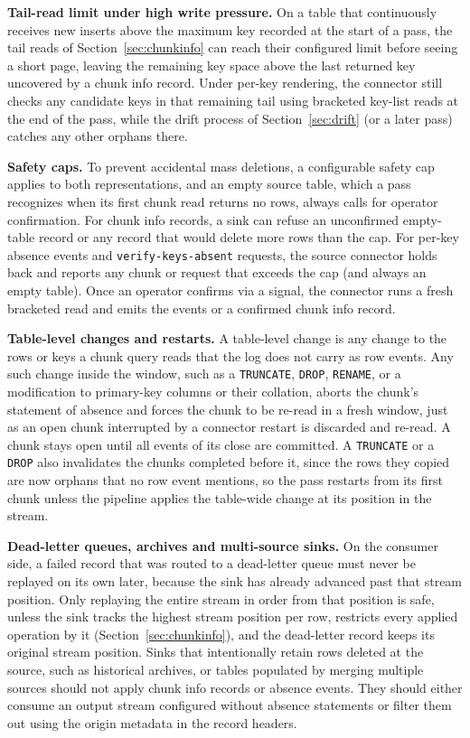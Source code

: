 \documentclass[sigconf,nonacm,10pt]{acmart}
\begin{document}
\textbf{Tail-read limit under high write pressure.} On a table that
continuously receives new inserts above the maximum key recorded at the start
of a pass, the tail reads of Section~\ref{sec:chunkinfo} can reach their
configured limit before seeing a short page, leaving the remaining key space
above the last returned key uncovered by a chunk info record. Under per-key
rendering, the connector still checks any candidate keys in that remaining tail
using bracketed key-list reads at the end of the pass, while the drift process
of Section~\ref{sec:drift} (or a later pass) catches any other orphans there.

\textbf{Safety caps.} To prevent accidental mass deletions, a configurable
safety cap applies to both representations, and an empty source table, which a pass recognizes when its first chunk read
returns no rows, always calls for operator confirmation. For chunk info records, a sink can refuse an
unconfirmed empty-table record or any record that would delete more rows than
the cap. For per-key absence events and \texttt{verify-keys-absent} requests,
the source connector holds back and reports any chunk or request that exceeds
the cap (and always an empty table). Once an operator confirms via a signal,
the connector runs a fresh bracketed read and emits the events or a confirmed
chunk info record.

\textbf{Table-level changes and restarts.} A table-level change is any change
to the rows or keys a chunk query reads that the log does not carry as row
events. Any such change inside the window, such as a \texttt{TRUNCATE},
\texttt{DROP}, \texttt{RENAME}, or a modification to primary-key columns or
their collation, aborts the chunk's statement of absence and forces the chunk to be re-read in a
fresh window, just as an open chunk interrupted by a connector restart is
discarded and re-read. A chunk stays open until all events of its close
are committed. A \texttt{TRUNCATE} or a \texttt{DROP} also invalidates
the chunks completed before it, since the rows they copied are now orphans that
no row event mentions, so the pass restarts from its first chunk unless the
pipeline applies the table-wide change at its position in the stream.

\textbf{Dead-letter queues, archives and multi-source sinks.} On the consumer
side, a failed record that was routed to a dead-letter queue must never be
replayed on its own later, because the sink has already advanced past that
stream position. Only replaying the entire stream in order from that position is
safe, unless the sink tracks the highest stream position per row, restricts
every applied operation by it (Section~\ref{sec:chunkinfo}), and the dead-letter
record keeps its original stream position. Sinks that
intentionally retain rows deleted at the source, such as historical archives, or
tables populated by merging multiple sources should not apply chunk info
records or absence events. They should either consume an output stream configured without
absence statements or filter them out using the origin metadata in the record
headers.
\end{document}
